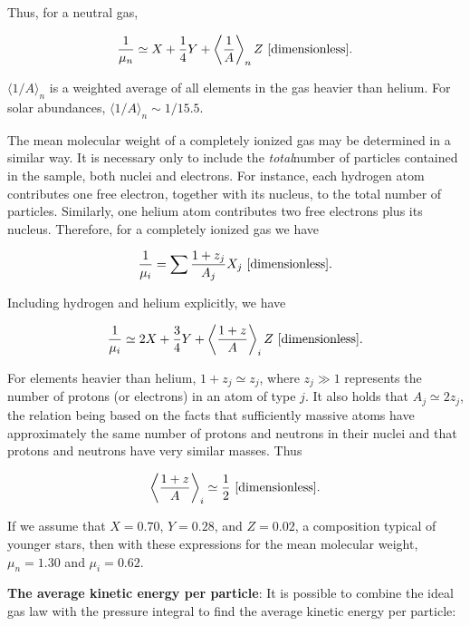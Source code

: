 \documentclass[a4paper,10pt]{article}
\begin{document}
{\noindent}Thus, for a neutral gas,

\begin{align*}
    \frac{1}{\mu_n} \simeq X + \frac{1}{4}Y + \left\langle\frac{1}{A}\right\rangle_n Z ~ [{\rm dimensionless}].
\end{align*}

{\noindent}$\langle1/A\rangle_n$ is a weighted average of all elements in the gas heavier than helium. For solar abundances, $\langle1/A\rangle_n\sim1/15.5$.

{\noindent}The mean molecular weight of a completely ionized gas may be determined in a similar way. It is necessary only to include the \textit{total}number of particles contained in the sample, both nuclei and electrons. For instance, each hydrogen atom contributes one free electron, together with its nucleus, to the total number of particles. Similarly, one helium atom contributes two free electrons plus its nucleus. Therefore, for a completely ionized gas we have

\begin{align*}
    \frac{1}{\mu_i} = \sum \frac{1+z_j}{A_j} X_j ~ [{\rm dimensionless}].
\end{align*}

{\noindent}Including hydrogen and helium explicitly, we have

\begin{align*}
    \frac{1}{\mu_i} \simeq 2X + \frac{3}{4}Y + \left\langle\frac{1+z}{A}\right\rangle_i Z ~ [{\rm dimensionless}].
\end{align*}

{\noindent}For elements heavier than helium, $1+z_j\simeq z_j$, where $z_j\gg1$ represents the number of protons (or electrons) in an atom of type $j$. It also holds that $A_j\simeq2z_j$, the relation being based on the facts that sufficiently massive atoms have approximately the same number of protons and neutrons in their nuclei and that protons and neutrons have very similar masses. Thus

\begin{align*}
    \left\langle\frac{1+z}{A}\right\rangle_i \simeq \frac{1}{2} ~ [{\rm dimensionless}].
\end{align*}

{\noindent}If we assume that $X=0.70$, $Y=0.28$, and $Z=0.02$, a composition typical of younger stars, then with these expressions for the mean molecular weight, $\mu_n=1.30$ and $\mu_i=0.62$. 

{\noindent}\textbf{The average kinetic energy per particle}: It is possible to combine the ideal gas law with the pressure integral to find the average kinetic energy per particle: 
\end{document}
